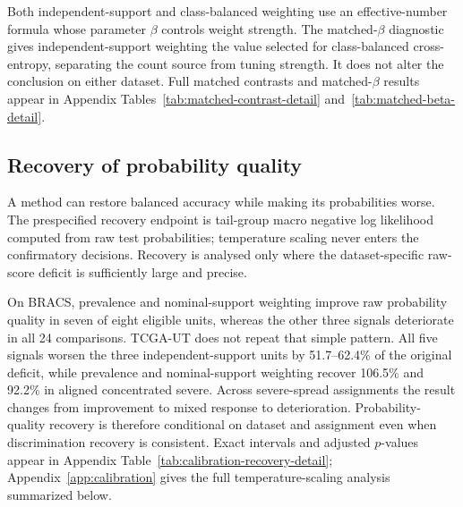 \documentclass[11pt]{article}
\newcommand{\resultstable}[1]{}
\begin{document}
Both independent-support and class-balanced weighting use an effective-number formula whose parameter $\beta$ controls weight strength. The matched-$\beta$ diagnostic gives independent-support weighting the value selected for class-balanced cross-entropy, separating the count source from tuning strength. It does not alter the conclusion on either dataset. Full matched contrasts and matched-$\beta$ results appear in Appendix Tables~\ref{tab:matched-contrast-detail} and~\ref{tab:matched-beta-detail}.

\subsection{Recovery of probability quality}
\label{sec:rq2-calibration}
A method can restore balanced accuracy while making its probabilities worse. The prespecified recovery endpoint is tail-group macro negative log likelihood computed from raw test probabilities; temperature scaling never enters the confirmatory decisions. Recovery is analysed only where the dataset-specific raw-score deficit is sufficiently large and precise.

\begin{table}[ht]
  \centering
  \small
  \resultstable{calibration_recovery_summary}
  \caption{Recovery of tail-group probability quality. Recovery is the percentage of the original negative-log-likelihood deficit.}
  \label{tab:calibration-recovery}
\end{table}

\noindent On BRACS, prevalence and nominal-support weighting improve raw probability quality in seven of eight eligible units, whereas the other three signals deteriorate in all \num{24} comparisons. TCGA-UT does not repeat that simple pattern. All five signals worsen the three independent-support units by \num{51.7}--\num{62.4}\% of the original deficit, while prevalence and nominal-support weighting recover \num{106.5}\% and \num{92.2}\% in aligned concentrated severe. Across severe-spread assignments the result changes from improvement to mixed response to deterioration. Probability-quality recovery is therefore conditional on dataset and assignment even when discrimination recovery is consistent. Exact intervals and adjusted $p$-values appear in Appendix Table~\ref{tab:calibration-recovery-detail}; Appendix~\ref{app:calibration} gives the full temperature-scaling analysis summarized below.
\end{document}
